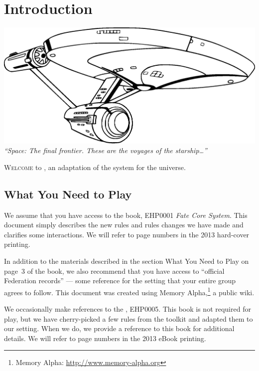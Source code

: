 \documentclass[12pt,titlepage,openany]{book}
\begin{document}
\mainmatter



\chapter{Introduction}\label{chap:intro}

\begin{center}
    \includegraphics[width=0.6\linewidth]{img/Enterprise.eps}\\
    \vspace{2ex}
    \textit{``Space: The final frontier. These are the voyages of the
    starship\ldots''}
\end{center}

\vspace{1em}

\noindent
\lettrine[lines=1]{W}{elcome} to \StarTrekFate{}, an adaptation of the
\FateCore{} system for the \StarTrek{} universe.

\section{What You Need to Play}

We assume that you have access to the \FateCore{} book, EHP0001 \textit{Fate
Core System}. This document simply describes the new rules and rules changes we
have made and clarifies some interactions. We will refer to page numbers in the
2013 hard-cover printing.

In addition to the materials described in the section What You Need to Play on
page~3 of the \FateCore{} book, we also recommend that you have access to
``official Federation records'' --- some reference for the \StarTrek{} setting
that your entire group agrees to follow. This document was created using Memory
Alpha,\footnote{Memory Alpha: \url{http://www.memory-alpha.org}} a public
\StarTrek{} wiki.

We occasionally make references to the \FateSystemToolkit{}, EHP0005. This book
is not required for play, but we have cherry-picked a few rules from the
toolkit and adapted them to our setting. When we do, we provide a reference to
this book for additional details. We will refer to page numbers in the 2013
eBook printing.
\end{document}
